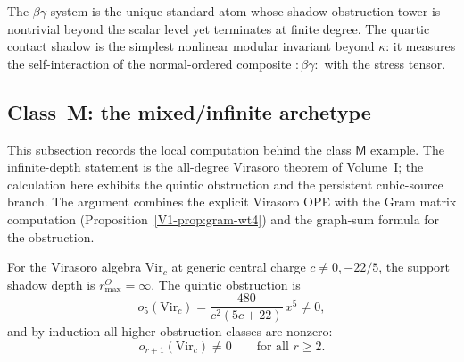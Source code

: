\begin{remark}
The $\beta\gamma$ system is the unique standard atom
whose shadow obstruction tower is nontrivial beyond the scalar
level yet terminates at finite degree. The quartic
contact shadow is the simplest nonlinear modular
invariant beyond $\kappa$: it measures the
self-interaction of the normal-ordered composite
${:}\beta\gamma{:}$ with the stress tensor.
\end{remark}


\subsection{Class~M: the mixed/infinite archetype}

This subsection records the local computation behind the class
$\mathsf M$ example. The infinite-depth statement is the
all-degree Virasoro theorem of Volume~I; the calculation here exhibits
the quintic obstruction and the persistent cubic-source branch. The
argument combines the explicit
Virasoro OPE with the Gram matrix computation
(Proposition~\ref{V1-prop:gram-wt4}) and the graph-sum
formula for the obstruction.

\begin{theorem}[$r^\Theta_{\max}(\mathrm{Vir}_c) = \infty$]
For the Virasoro algebra $\mathrm{Vir}_c$ at generic
central charge $c \neq 0, -22/5$, the support shadow depth is
\(r^\Theta_{\max} = \infty\). The quintic obstruction is
\begin{equation}%
o_5(\mathrm{Vir}_c) =
\frac{480}{c^2(5c+22)}\,x^5 \neq 0,
\end{equation}
and by induction all higher obstruction classes are
nonzero:
\begin{equation}%
o_{r+1}(\mathrm{Vir}_c) \neq 0
\qquad \text{for all } r \geq 2.
\end{equation}
\end{theorem}

